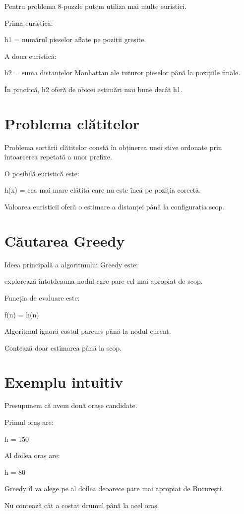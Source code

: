 \documentclass[12pt,a4paper]{article}
\begin{document}
Pentru problema 8-puzzle putem utiliza mai multe euristici.

Prima euristică:

h1 = numărul pieselor aflate pe poziții greșite.

A doua euristică:

h2 = suma distanțelor Manhattan ale tuturor pieselor până la pozițiile finale.

În practică, h2 oferă de obicei estimări mai bune decât h1.

\section{Problema clătitelor}

Problema sortării clătitelor constă în obținerea unei stive ordonate prin întoarcerea repetată a unor prefixe.

O posibilă euristică este:

h(x) = cea mai mare clătită care nu este încă pe poziția corectă.

Valoarea euristicii oferă o estimare a distanței până la configurația scop.

\section{Căutarea Greedy}

Ideea principală a algoritmului Greedy este:

explorează întotdeauna nodul care pare cel mai apropiat de scop.

Funcția de evaluare este:

f(n) = h(n)

Algoritmul ignoră costul parcurs până la nodul curent.

Contează doar estimarea până la scop.

\section{Exemplu intuitiv}

Presupunem că avem două orașe candidate.

Primul oraș are:

h = 150

Al doilea oraș are:

h = 80

Greedy îl va alege pe al doilea deoarece pare mai apropiat de București.

Nu contează cât a costat drumul până la acel oraș.
\end{document}
